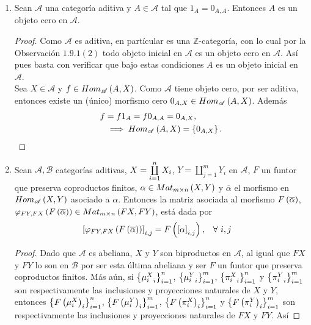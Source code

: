 \documentclass{article}
\begin{document}
\begin{enumerate}[label=\textbf{Ej \arabic*.}]
\begin{proof}
			El caso en que $F$ es contravariante es análogo a esta demostración.\\
		\end{proof}
		\item Sean $\mathscr{A}$ una categoría aditiva y $A\in\mathscr{A}$ tal que $1_A=0_{A,A}$. Entonces $A$ es un objeto cero en $\mathscr{A}$.
		\begin{proof}
			Como $\mathscr{A}$ es aditiva, en partícular es una $\mathbb{Z}$-categoría, con lo cual por la Observación $1.9.1(2)$ todo objeto inicial en $\mathscr{A}$ es un objeto cero en $\mathscr{A}$. Así pues basta con verificar que bajo estas condiciones $A$ es un objeto inicial en $\mathscr{A}$. \\
			Sea $X\in\mathscr{A}$ y $f\in Hom_{\mathscr{A}}\left(A,X\right)$. Como $\mathscr{A}$ tiene objeto cero, por ser aditiva, entonces existe un (único) morfismo cero $0_{A,X}\in Hom_{\mathscr{A}}\left(A,X\right)$. Además
			\begin{align*}
				f&=f 1_A=f 0_{A,A}= 0_{A,X},\\
				&\implies Hom_{\mathscr{A}}\left(A,X\right)=\left\{0_{A,X}\right\}.
			\end{align*}
		\end{proof}
		\item Sean $\mathscr{A}, \mathscr{B}$ categorías aditivas, $X=\coprod\limits_{i=1}^{n} X_i$, $Y=\coprod\limits_{j=1}^{m}Y_i$ en $\mathscr{A}$, $F$ un funtor que preserva coproductos finitos, $\alpha\in Mat_{m\times n}\left(X,Y\right)$ y $\overline{\alpha}$ el morfismo en $Hom_{\mathscr{A}}\left(X,Y\right)$ asociado a $\alpha$. Entonces la matriz asociada al morfismo $F\left(\overline{\alpha}\right)$, $\varphi_{FY,FX}\left(F\left(\overline{\alpha}\right)\right)\in Mat_{m\times n}\left(FX,FY\right)$, está dada por
		\begin{align*}
			\left[\varphi_{FY,FX}\left(F\left(\overline{\alpha}\right)\right)\right]_{i,j}&=F\left(\left[\alpha\right]_{i,j}\right), && \forall\ i,j
		\end{align*}
		\begin{proof}
			Dado que $\mathscr{A}$ es abeliana, $X$ y $Y$ son biproductos en $\mathscr{A}$, al igual que $FX$ y $FY$ lo son en $\mathscr{B}$ por ser esta última abeliana y ser $F$ un funtor que preserva coproductos finitos. Más aún, si ${\left\{{\mu_i^X}_{i}\right\}}_{i=1}^{n}$, ${\left\{{\mu_i^Y}_{i}\right\}}_{i=1}^{m}$, ${\left\{{\pi_i^X}_{i}\right\}}_{i=1}^{n}$ y ${\left\{{\pi_i^Y}_{i}\right\}}_{i=1}^{m}$ son respectivamente las inclusiones y proyecciones naturales de $X$ y $Y$, entonces ${\left\{{F\left(\mu_i^X\right)}_{i}\right\}}_{i=1}^{n}$, ${\left\{{F\left(\mu_i^Y\right)}_{i}\right\}}_{i=1}^{m}$, ${\left\{{F\left(\pi_i^X\right)}_{i}\right\}}_{i=1}^{n}$ y ${\left\{{F\left(\pi_i^Y\right)}_{i}\right\}}_{i=1}^{m}$ son respectivamente las inclusiones y proyecciones naturales de $FX$ y $FY$. Así

\end{proof}
\end{enumerate}
\end{document}
